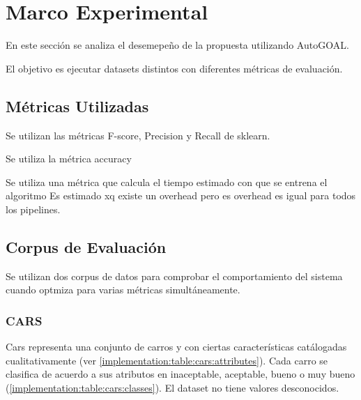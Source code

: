 \section{Marco Experimental}

En este secci\'on se analiza el desemepe\~no de la propuesta utilizando AutoGOAL.

El objetivo es ejecutar datasets distintos con diferentes m\'etricas de evaluaci\'on.

\subsection{M\'etricas Utilizadas}

Se utilizan las m\'etricas F-score, Precision y Recall de sklearn.

Se utiliza la m\'etrica accuracy

Se utiliza una m\'etrica que calcula el tiempo estimado con que se entrena el algoritmo
Es estimado xq existe un overhead pero es overhead es igual para todos los pipelines.

\subsection{Corpus de Evaluaci\'on}

Se utilizan dos corpus de datos para comprobar el comportamiento del sistema cuando optmiza para varias m\'etricas simult\'aneamente.

\subsubsection{CARS}
Cars representa una conjunto de carros y con ciertas caracter\'isticas cat\'alogadas cualitativamente (ver \ref{implementation:table:cars:attributes}). Cada carro se clasifica de acuerdo a sus atributos  en inaceptable, aceptable, bueno o muy bueno (\ref{implementation:table:cars:classes}). El dataset no tiene valores desconocidos.

